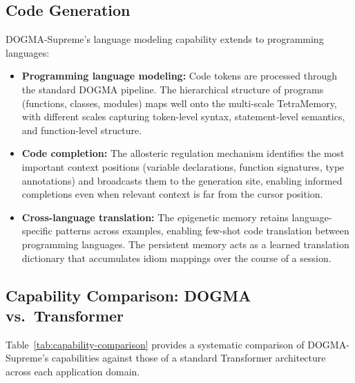 \subsection{Code Generation}
\label{sec:app-code}

DOGMA-Supreme's language modeling capability extends to programming languages:

\begin{itemize}[leftmargin=1.8em]
  \item \textbf{Programming language modeling:} Code tokens are processed through the standard DOGMA pipeline. The hierarchical structure of programs (functions, classes, modules) maps well onto the multi-scale TetraMemory, with different scales capturing token-level syntax, statement-level semantics, and function-level structure.
  \item \textbf{Code completion:} The allosteric regulation mechanism identifies the most important context positions (variable declarations, function signatures, type annotations) and broadcasts them to the generation site, enabling informed completions even when relevant context is far from the cursor position.
  \item \textbf{Cross-language translation:} The epigenetic memory retains language-specific patterns across examples, enabling few-shot code translation between programming languages. The persistent memory acts as a learned translation dictionary that accumulates idiom mappings over the course of a session.
\end{itemize}

\subsection{Capability Comparison: DOGMA vs.\ Transformer}

Table~\ref{tab:capability-comparison} provides a systematic comparison of DOGMA-Supreme's capabilities against those of a standard Transformer architecture across each application domain.

